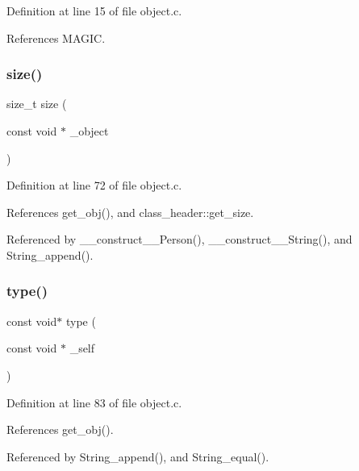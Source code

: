 Definition at line 15 of file object.\+c.



References M\+A\+G\+IC.

\mbox{\label{group__basic_gafac8564ed88a6f8585f043fc6b2fa7e1}} 
\subsubsection{\texorpdfstring{size()}{size()}}
{\footnotesize\ttfamily size\+\_\+t size (\begin{DoxyParamCaption}\item[{const void $\ast$}]{\+\_\+object }\end{DoxyParamCaption})}



Definition at line 72 of file object.\+c.



References get\+\_\+obj(), and class\+\_\+header\+::get\+\_\+size.



Referenced by \+\_\+\+\_\+construct\+\_\+\+\_\+\+Person(), \+\_\+\+\_\+construct\+\_\+\+\_\+\+String(), and String\+\_\+append().

\mbox{\label{group__basic_ga504cef7fd39aff50e8e27f4f74568753}} 
\subsubsection{\texorpdfstring{type()}{type()}}
{\footnotesize\ttfamily const void$\ast$ type (\begin{DoxyParamCaption}\item[{const void $\ast$}]{\+\_\+self }\end{DoxyParamCaption})}



Definition at line 83 of file object.\+c.



References get\+\_\+obj().



Referenced by String\+\_\+append(), and String\+\_\+equal().

